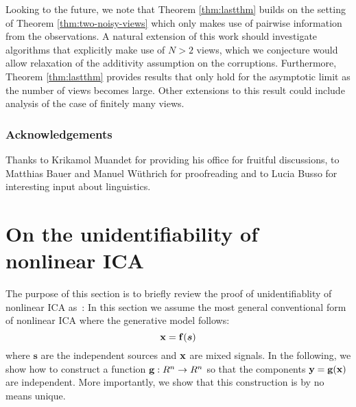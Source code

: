Looking to the future, we note that Theorem \ref{thm:lastthm} builds on the setting of Theorem \ref{thm:two-noisy-views} which only makes use of pairwise information from the observations.
A natural extension of this work should investigate algorithms that explicitly make use of $N>2$ views, which we conjecture would allow relaxation of the additivity assumption on the corruptions.
Furthermore, Theorem \ref{thm:lastthm} provides results that only hold for the asymptotic limit as the number of views becomes large.
Other extensions to this result could include analysis of the case of finitely many views.








\subsubsection*{Acknowledgements}

Thanks to Krikamol Muandet for providing his office for fruitful discussions, to Matthias Bauer and Manuel W\"uthrich for proofreading and to Lucia Busso for interesting input about linguistics.

%
%
%
%
%
%
%
%
%

\section{On the unidentifiability of nonlinear ICA}
\label{sec:on_unident}


The purpose of this section is to briefly review the proof of unidentifiablity of nonlinear ICA as~\cite{hyvarinen1999nonlinear}:
In this section we assume the most general conventional form of nonlinear ICA where the generative model follows:
\begin{equation}
    \label{eq:nonlinear_ica_noiseless}
    \mathbf{x}=\mathbf{f}(\bm{s})
\end{equation}
where $\bm{s}$ are the independent sources and $\mathbf{x}$ are mixed signals. In the following, we show how to construct a function $\mathbf{g}:R^n\to R^n$ so that the components $\mathbf{y}=\mathbf{g}(\mathbf{x})$ are independent. More importantly, we show that this construction is by no means unique.
